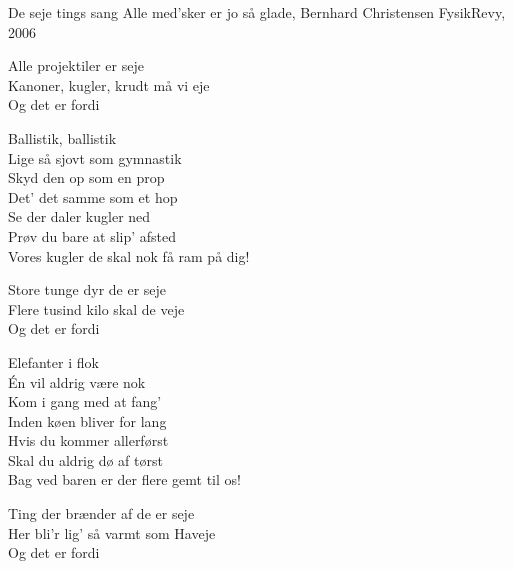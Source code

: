 \begin{song}{De seje tings sang}
  {} %
  {Alle med'sker er jo så glade, Bernhard Christensen} %
  {} %
  {FysikRevy, 2006} %
  {\NotCCLIed} %

  \begin{SBVerse}
    Alle projektiler er seje\\
    Kanoner, kugler, krudt må vi eje\\
    Og det er fordi
  \end{SBVerse}

  \begin{SBChorus}
    Ballistik, ballistik\\
    Lige så sjovt som gymnastik\\
    Skyd den op som en prop\\
    Det' det samme som et hop\\
    Se der daler kugler ned\\
    Prøv du bare at slip' afsted\\
    Vores kugler de skal nok få ram på dig!
  \end{SBChorus}

  \begin{SBVerse}
    Store tunge dyr de er seje\\
    Flere tusind kilo skal de veje\\
    Og det er fordi
  \end{SBVerse}

  \begin{SBChorus}
    Elefanter i flok\\
    Én vil aldrig være nok\\
    Kom i gang med at fang'\\
    Inden køen bliver for lang\\
    Hvis du kommer allerførst\\
    Skal du aldrig dø af tørst\\
    Bag ved baren er der flere gemt til os!
  \end{SBChorus}

  \begin{SBVerse}
    Ting der brænder af de er seje\\
    Her bli'r lig' så varmt som Haveje\\
    Og det er fordi
  \end{SBVerse}


\end{song}
